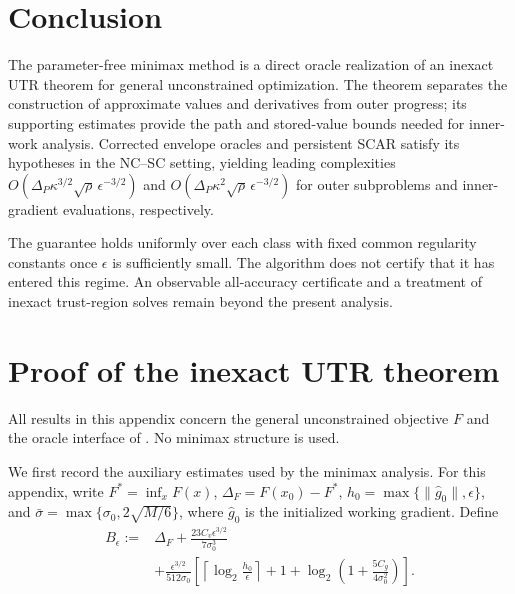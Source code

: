 \documentclass{article}
\begin{document}
\clearpage


\section{Conclusion}
\label{sec:conclusion}

The parameter-free minimax method is a direct oracle realization
of an inexact UTR theorem for general unconstrained optimization.
The theorem separates the construction of approximate values and
derivatives from outer progress; its supporting estimates provide
the path and stored-value bounds needed for inner-work analysis.
Corrected envelope oracles and persistent SCAR satisfy its
hypotheses in the NC--SC setting, yielding leading complexities
$O(\Delta_P\kappa^{3/2}\sqrt\rho\,\epsilon^{-3/2})$ and
$O(\Delta_P\kappa^2\sqrt\rho\,\epsilon^{-3/2})$ for outer
subproblems and inner-gradient evaluations, respectively.

The guarantee holds uniformly over each class with fixed common
regularity constants once $\epsilon$ is sufficiently small.
The algorithm does not certify that it has entered this regime.
An observable all-accuracy certificate and a treatment of inexact
trust-region solves remain beyond the present analysis.


\clearpage
\appendix
\section{Proof of the inexact UTR theorem}
\label{app:adaptive-utr-proofs}

All results in this appendix concern the general unconstrained
objective $F$ and the oracle interface of
.  No minimax structure is used.

We first record the auxiliary estimates used by the minimax analysis.
For this appendix, write $F^*=\inf_xF(x)$,
$\Delta_F=F(x_0)-F^*$, $h_0=\max\{\|\widehat g_0\|,\epsilon\}$,
and $\bar\sigma=\max\{\sigma_0,2\sqrt{M/6}\}$, where
$\widehat g_0$ is the initialized working gradient.  Define
\begin{equation}\label{eq:utr-budget}
\begin{aligned}
 B_\epsilon:={}&\Delta_F+
 \frac{23C_v\epsilon^{3/2}}{7\sigma_0^3}\\
 &+\frac{\epsilon^{3/2}}{512\sigma_0}
 \left[\left\lceil\log_2\frac{h_0}{\epsilon}\right\rceil
       +1+\log_2\left(1+\frac{5C_g}{4\sigma_0^2}\right)\right].
\end{aligned}
\end{equation}
\end{document}
